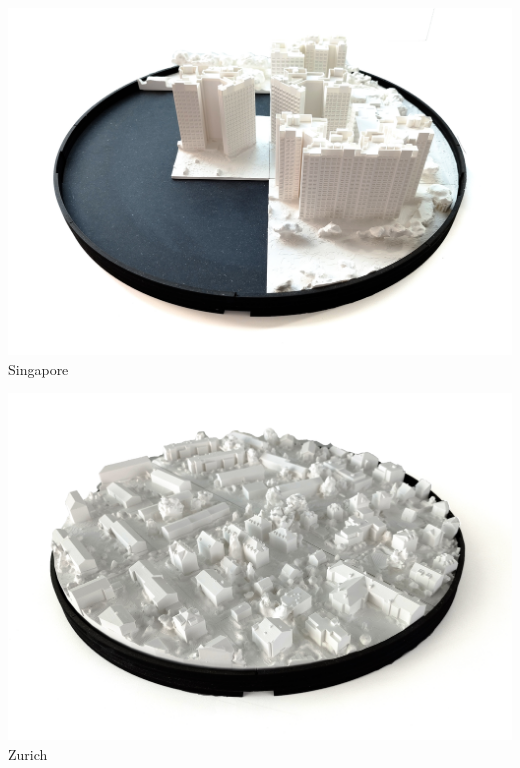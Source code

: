 \documentclass[a4paper,9pt]{article}
\begin{document}
     \begin{minipage}{0.48\linewidth}
        \centering
        \includegraphics[width=.95\linewidth]{Images/Model SG_1.jpg}
       \\{Singapore}
         \label{base sg2}
    \end{minipage}
    \hfill
    \begin{minipage}{0.48\linewidth}
         \centering
        \includegraphics[width=.95\linewidth]{Images/Model ZH_1.jpg}
       \\{Zurich}
        \label{base zh2}
    \end{minipage}
    \label{baseee}
\end{document}
